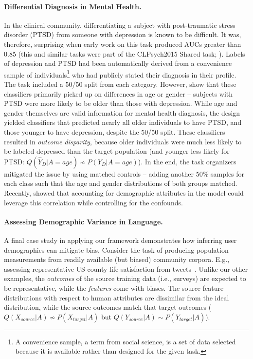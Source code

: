 \paragraph*{Differential Diagnosis in Mental Health.}
\label{appendix:case4}
In the clinical community, differentiating a subject with post-traumatic stress disorder (PTSD) from someone with depression is known to be difficult. It was, therefore, surprising when early work on this task produced AUCs greater than 0.85 (this and similar tasks were part of the CLPsych2015 Shared task; \cite{coppersmith2015clpsych}).
Labels of depression and PTSD had been automatically derived from a convenience sample of individuals\footnote{A convenience sample, a term from social science, is a set of data selected because it is available rather than designed for the given task.} who had publicly stated their diagnosis in their profile. The task included a 50/50 split from each category.  
However,  show that these classifiers primarily picked up on differences in age or gender -- subjects with PTSD were more likely to be older than those with depression. 
While age and gender themselves are valid information for mental health diagnosis, the design yielded classifiers that predicted nearly all older individuals to have PTSD, and those younger to have depression, despite the 50/50 split. These classifiers resulted in \textit{outcome disparity}, because older individuals were much less likely to be labeled depressed than the target population (and younger less likely for PTSD:  $Q(\hat{Y}_{D}|A = age) \nsim P(Y_{D}|A = age)$).
In the end, the task organizers mitigated the issue by using matched controls -- adding another 50\% samples for each class such that the age and gender distributions of both groups matched. 
Recently,  showed that accounting for demographic attributes in the model could leverage this correlation while controlling for the confounds.

\paragraph*{Assessing Demographic Variance in Language.}
\label{appendix:case5}
A final case study in applying our framework demonstrates how inferring user demographics can mitigate bias. 
Consider the task of producing population measurements from readily available (but biased) community corpora. E.g., assessing representative US county life satisfaction from tweets~\cite{schwartz2013characterizing}. 
Unlike our other examples, the \textit{outcomes} of the source training data (i.e., surveys) are expected to be representative, while the \textit{features} come with biases. The source feature distributions with respect to human attributes are dissimilar from the ideal distribution, while the source outcomes match that target outcomes ($Q(X_{source}|A) \nsim P(X_{target}|A)$ but $Q(Y_{source}|A) \sim P(Y_{target}|A)$). 

